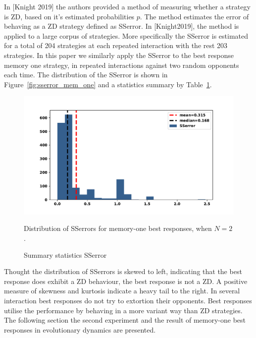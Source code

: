 \documentclass[10pt]{article}
\begin{document}
In [Knight 2019] the authors provided a method of measuring whether a strategy is
ZD, based on it's estimated probabilities \(p\). The method estimates the error of
behaving as a ZD strategy defined as SSerror. In [Knight2019], the method is
applied to a large corpus of strategies. More specifically the SSerror is
estimated for a total of 204 strategies at each repeated interaction with the
rest 203 strategies. In this paper we similarly apply the SSerror to the best
response memory one strategy, in repeated interactions against two random opponents
each time.
The distribution of the SSerror is shown in Figure~\ref{fig:sserror_mem_one} and
a statistics summary by Table~\ref{table:sserror_stats}.

\begin{figure}[!htbp]
    \begin{minipage}{0.74\textwidth}
            \begin{center}
                \includegraphics[width=\linewidth]{img/best_respones_sserror.pdf}
            \end{center}
                \caption{Distribution of SSerrors for memory-one best responses, when \(N=2\).}
                \label{fig:sserror_mem_one}
    \end{minipage}
    \begin{minipage}{0.24\textwidth}
        \centering
        \captionsetup{type=table}
        \resizebox{.75\columnwidth}{!}{%
            }
            \caption{Summary statistics SSerror}
            \label{table:sserror_stats}
      \end{minipage}
\end{figure}

Thought the distribution of SSerrors is skewed to left, indicating that the best
response does exhibit a ZD behaviour, the best response is not a ZD. A positive
measure of skewness and kurtosis indicate a heavy tail to the right. In several
interaction best responses do not try to extortion their opponents. Best
responses utilise the performance by behaving in a more variant way than ZD
strategies. The following section the second experiment and the result of
memory-one best responses in evolutionary dynamics are presented.
\end{document}

